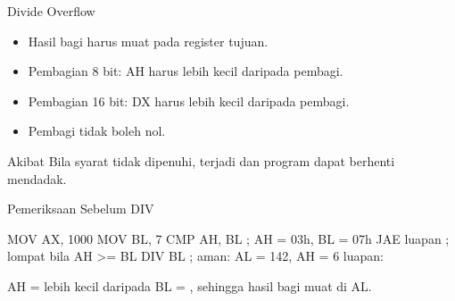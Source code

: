 \documentclass[aspectratio=169,11pt]{beamer}
\begin{document}
\begin{frame}{Divide Overflow}
\small
\begin{itemize}
    \item Hasil bagi harus muat pada register tujuan.

    \vspace{0.18em}
    \item Pembagian 8 bit: AH harus lebih kecil daripada pembagi.

    \vspace{0.18em}
    \item Pembagian 16 bit: DX harus lebih kecil daripada pembagi.

    \vspace{0.18em}
    \item Pembagi tidak boleh nol.
\end{itemize}

\vspace{0.25em}
\begin{alertblock}{Akibat}
\small Bila syarat tidak dipenuhi, terjadi 
dan program dapat berhenti mendadak.
\end{alertblock}
\end{frame}

\begin{frame}[fragile]{Pemeriksaan Sebelum DIV}
\small
\begin{kodeasm}[numbers=none]
MOV AX, 1000
MOV BL, 7
CMP AH, BL          ; AH = 03h, BL = 07h
JAE luapan          ; lompat bila AH >= BL
DIV BL              ; aman: AL = 142, AH = 6
luapan:
\end{kodeasm}

\vspace{0.15em}
{\footnotesize\color{obeGray}AH =  lebih kecil daripada
BL = , sehingga hasil bagi muat di AL.\par}
\end{frame}
\end{document}
